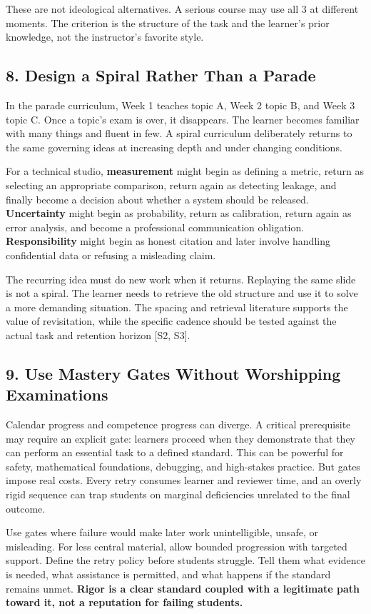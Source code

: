These are not ideological alternatives. A serious course may use all 3 at different moments. The criterion is the structure of the task and the learner's prior knowledge, not the instructor's favorite style.

\subsection*{8. Design a Spiral Rather Than a Parade}

In the parade curriculum, Week 1 teaches topic A, Week 2 topic B, and Week 3 topic C. Once a topic's exam is over, it disappears. The learner becomes familiar with many things and fluent in few. A spiral curriculum deliberately returns to the same governing ideas at increasing depth and under changing conditions.

For a technical studio, \textbf{measurement} might begin as defining a metric, return as selecting an appropriate comparison, return again as detecting leakage, and finally become a decision about whether a system should be released. \textbf{Uncertainty} might begin as probability, return as calibration, return again as error analysis, and become a professional communication obligation. \textbf{Responsibility} might begin as honest citation and later involve handling confidential data or refusing a misleading claim.

The recurring idea must do new work when it returns. Replaying the same slide is not a spiral. The learner needs to retrieve the old structure and use it to solve a more demanding situation. The spacing and retrieval literature supports the value of revisitation, while the specific cadence should be tested against the actual task and retention horizon [S2, S3].

\subsection*{9. Use Mastery Gates Without Worshipping Examinations}

Calendar progress and competence progress can diverge. A critical prerequisite may require an explicit gate: learners proceed when they demonstrate that they can perform an essential task to a defined standard. This can be powerful for safety, mathematical foundations, debugging, and high-stakes practice. But gates impose real costs. Every retry consumes learner and reviewer time, and an overly rigid sequence can trap students on marginal deficiencies unrelated to the final outcome.

Use gates where failure would make later work unintelligible, unsafe, or misleading. For less central material, allow bounded progression with targeted support. Define the retry policy before students struggle. Tell them what evidence is needed, what assistance is permitted, and what happens if the standard remains unmet. \textbf{Rigor is a clear standard coupled with a legitimate path toward it, not a reputation for failing students.}
